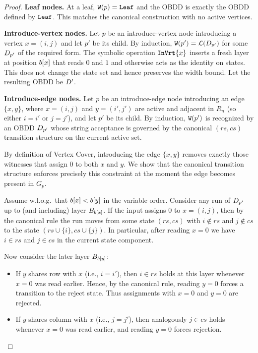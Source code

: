 \begin{proof}
\smallskip
\noindent\textbf{Leaf nodes.}
At a leaf, $\texttt{W}(p)=\texttt{Leaf}$ and the OBDD is exactly the OBDD defined by
$\texttt{\textbf{Leaf}}$. This matches the canonical construction with no active vertices.

\smallskip
\noindent\textbf{Introduce-vertex nodes.}
Let $p$ be an introduce-vertex node introducing a vertex $x=(i,j)$ and let $p'$
be its child. By induction, $\texttt{W}(p')=\mathcal{L}(D_{p'})$ for some $D_{p'}$
of the required form. The symbolic operation $\texttt{\textbf{InVrt}}\{x\}$ inserts a
fresh layer at position $b[x]$ that reads $0$ and $1$ and otherwise
acts as the identity on states. This does not change the state set and hence
preserves the width bound. Let the resulting OBDD be $D'$.

\smallskip
\noindent\textbf{Introduce-edge nodes.}
Let $p$ be an introduce-edge node introducing an edge $\{x,y\}$, where
$x=(i,j)$ and $y=(i',j')$ are active and adjacent in $R_n$ (so either $i=i'$ or
$j=j'$), and let $p'$ be its child. By induction, $\texttt{W}(p')$ is recognized
by an OBDD $D_{p'}$ whose string acceptance is governed by the canonical
$(rs,cs)$ transition structure on the current active set.

By definition of {\sc Vertex Cover}, introducing the edge $\{x,y\}$ removes
exactly those witnesses that assign $0$ to both $x$ and $y$. We show that the
canonical transition structure enforces precisely this constraint at the moment
the edge becomes present in $G_p$.

Assume w.l.o.g.\ that $b[x] < b[y]$ in the variable
order. Consider any run of $D_{p'}$ up to (and including) layer
$B_{b[x]}$. If the input assigns $0$ to $x=(i,j)$, then by the
canonical rule the run moves from some state $(rs,cs)$ with $i\notin rs$ and
$j\notin cs$ to the state $(rs\cup\{i\}, cs\cup\{j\})$. In particular, after
reading $x=0$ we have $i \in rs$ and $j \in cs$ in the current state component.

Now consider the later layer $B_{b[y]}$:
\begin{itemize}
\item If $y$ shares row with $x$ (i.e., $i=i'$), then $i \in rs$ holds at this
layer whenever $x=0$ was read earlier. Hence, by the canonical rule, reading
$y=0$ forces a transition to the reject state. Thus assignments with $x=0$ and
$y=0$ are rejected.
\item If $y$ shares column with $x$ (i.e., $j=j'$), then analogously $j \in cs$
holds whenever $x=0$ was read earlier, and reading $y=0$ forces rejection.
\end{itemize}


\end{proof}

